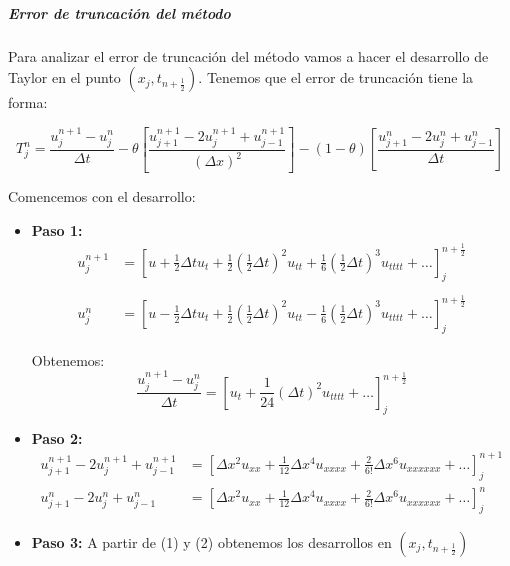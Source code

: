 \subparagraph{Error de truncación del método}\mbox{}

Para analizar el error de truncación del método vamos a hacer el desarrollo de Taylor en el punto $(x_j, t_{n+\frac{1}{2}})$. Tenemos que el error de truncación tiene la forma:

$$T_j^n = \frac{u_{j}^{n+1} - u_{j}^{n}}{\Delta t} - \theta\left[\frac{u_{j+1}^{n+1}-2u_{j}^{n+1}+u_{j-1}^{n+1}}{(\Delta x) ^2}\right] - (1-\theta)\left[\frac{u_{j+1}^{n}-2u_{j}^{n}+u_{j-1}^{n}}{\Delta t}\right]$$

Comencemos con el desarrollo:
\begin{itemize}
	\item  \textbf{Paso 1:}
	\begin{align*}
	u_{j}^{n+1} & = \left[u + \frac{1}{2}\Delta tu_t + \frac{1}{2}\left(\frac{1}{2}\Delta t\right)^2u_{tt} + \frac{1}{6}\left(\frac{1}{2}\Delta t\right)^3u_{tttt} + \hdots \right]_j^{n+\frac{1}{2}}\\\\
	u_{j}^{n} & = \left[u - \frac{1}{2}\Delta tu_t + \frac{1}{2}\left(\frac{1}{2}\Delta t\right)^2u_{tt} - \frac{1}{6}\left(\frac{1}{2}\Delta t\right)^3u_{tttt} + \hdots \right]_j^{n+\frac{1}{2}}
	\end{align*}
	
	Obtenemos:	
	$$\frac{u_j^{n+1}-u_j^n}{\Delta t} = \left[u_t+\frac{1}{24}(\Delta t)^2u_{tttt}+\hdots \right]_j^{n+\frac{1}{2}}$$
	
	\item \textbf{Paso 2:}
	\begin{align*}
	u_{j+1}^{n+1} -2u_{j}^{n+1} + u_{j-1}^{n+1} & = \left[\Delta x ^2 u_{xx} + \frac{1}{12}\Delta x ^4 u_{xxxx} + \frac{2}{6!}\Delta x ^6 u_{xxxxxx}+\hdots \right]_j^{n+1}\\
	u_{j+1}^{n} -2u_{j}^{n} + u_{j-1}^{n} & = \left[\Delta x ^2 u_{xx} + \frac{1}{12}\Delta x ^4 u_{xxxx} + \frac{2}{6!}\Delta x ^6 u_{xxxxxx}+\hdots \right]_j^{n}
	\end{align*}
	\item \textbf{Paso 3:} A partir de (1) y (2) obtenemos los desarrollos en $(x_j, t_{n+\frac{1}{2}})$
	

\end{itemize}
